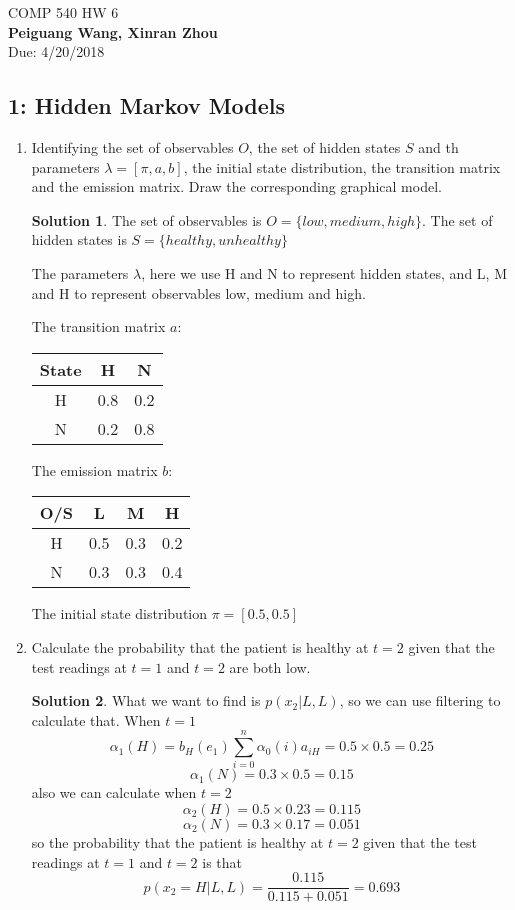 \documentclass[]{book}
\theoremstyle{definition}
\newtheorem*{soln}{Solution}
\begin{document}
\begin{center}
{\Large COMP 540 \hspace{0.5cm} HW 6}\\
\textbf{Peiguang Wang, Xinran Zhou}\\ %
Due: 4/20/2018 %
\end{center}

\vspace{0.2 cm}


\subsection*{1: Hidden Markov Models}
\begin{enumerate}
	\item Identifying the set of observables $O$, the set of hidden states $S$ and th parameters $\lambda = [\pi, a, b]$, the initial state distribution, the transition matrix and the emission matrix. Draw the corresponding graphical model.
	\begin{soln}
		The set of observables is $O = \{low, medium, high\}$. The set of hidden states is $S = \{healthy, unhealthy\}$
		
		The parameters $\lambda$, here we use H and N to represent hidden states, and L, M and H to represent observables low, medium and high.
		
		The transition matrix $a$:
		\begin{tabular}{ccc}
			\toprule
			State&H&N\\
			\midrule
			H&0.8&0.2\\
			N&0.2&0.8\\
			\bottomrule
		\end{tabular}
	
		The emission matrix $b$: 
		\begin{tabular}{cccc}
			\toprule
			O/S&L&M&H\\
			\midrule
			H&0.5&0.3&0.2\\
			N&0.3&0.3&0.4\\
			\bottomrule
		\end{tabular} 
		
		The initial state distribution $\pi = [0.5,0.5]$
		
		
	\end{soln}
	\item Calculate the probability that the patient is healthy at $ t=2$ given that the test readings at $t = 1$ and $t = 2 $ are both low.
	\begin{soln}
		What we want to find is $p(x_2|L,L)$, so we can use filtering to calculate that. When $t = 1$
		$$\alpha_1(H) = b_H(e_1) \sum_{i =0}^{n}\alpha_0(i) a_{iH} = 0.5\times0.5 = 0.25$$
		$$\alpha_1(N) = 0.3 \times 0.5 = 0.15$$
		also we can calculate when $t = 2$
		$$\alpha_2(H) = 0.5 \times 0.23 = 0.115$$
		$$\alpha_2(N) = 0.3 \times 0.17 = 0.051$$
		so the probability that the patient is healthy at $ t=2$ given that the test readings at $t = 1$ and $t = 2 $ is that 
		$$p(x_2 = H|L,L) = \frac{0.115}{0.115+0.051} = 0.693$$
		

\end{soln}
\end{enumerate}
\end{document}
